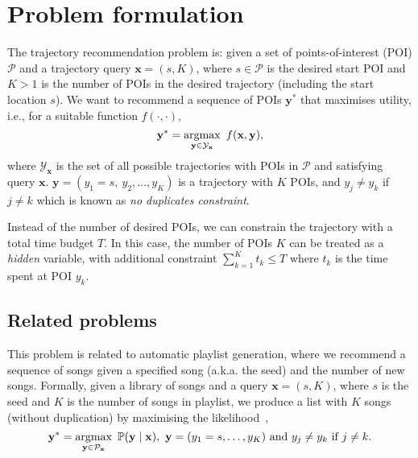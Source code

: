 \section{Problem formulation}
\label{sec:formulation}

The trajectory recommendation problem is: given a set of points-of-interest (POI) $\mathcal{P}$ and a trajectory query $\mathbf{x} = (s, K)$,
where $s \in \mathcal{P}$ is the desired start POI and $K > 1$ is the number of POIs in the desired trajectory (including the start location $s$).
We want to recommend a sequence of POIs $\mathbf{y}^*$ that maximises utility, i.e., for a suitable function $f(\cdot,\cdot)$,
\begin{equation*}
\mathbf{y}^* = \operatorname*{argmax}_{\mathbf{y} \in \mathcal{Y}_\mathbf{x}}~f(\mathbf{x}, \mathbf{y}),
\end{equation*}
where $\mathcal{Y}_\mathbf{x}$ is the set of all possible trajectories with POIs in $\mathcal{P}$ and satisfying query $\mathbf{x}$.
$\mathbf{y} = (y_1 = s,~ y_2, \dots, y_K)$ is a trajectory with $K$ POIs, and $y_j \ne y_k$ if $j \ne k$ 
which is known as \emph{no duplicates constraint}.

Instead of the number of desired POIs, we can constrain the trajectory with a total time budget $T$.
In this case, the number of POIs $K$ can be treated as a \emph{hidden} variable, with additional constraint $\sum_{k=1}^K t_k \le T$ 
where $t_k$ is the time spent at POI $y_k$.



\subsection{Related problems}
\label{sec:related}

This problem is related to automatic playlist generation, 
where we recommend a sequence of songs given a specified song (a.k.a. the seed) and the number of new songs.
Formally, given a library of songs and a query $\mathbf{x} = (s, K)$, where $s$ is the seed and $K$ is the number of songs in playlist,
we produce a list with $K$ songs (without duplication) by maximising the likelihood~\cite{chen2012playlist},
\begin{equation*}
\mathbf{y}^* = \operatorname*{argmax}_{\mathbf{y} \in \mathcal{P}_\mathbf{x}}~ \mathbb{P}(\mathbf{y} \mid \mathbf{x}),~ \mathbf{y} = (y_1=s,\dots,y_K) 
~\text{and}~ y_j \ne y_k ~\text{if}~ j \ne k.
\end{equation*}

